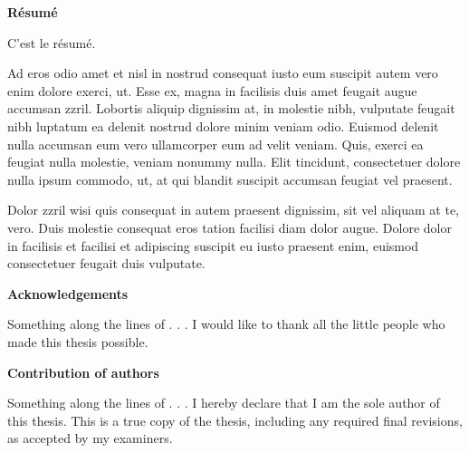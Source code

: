 
\begin{center}\textbf{R\'{e}sum\'{e}}\end{center}

C'est le r\'{e}sum\'{e}.

Ad eros odio amet et nisl in nostrud consequat iusto eum suscipit autem vero enim dolore exerci, ut. Esse ex, magna in facilisis duis amet feugait augue accumsan zzril. Lobortis aliquip dignissim at, in molestie nibh, vulputate feugait nibh luptatum ea delenit nostrud dolore minim veniam odio. Euismod delenit nulla accumsan eum vero ullamcorper eum ad velit veniam. Quis, exerci ea feugiat nulla molestie, veniam nonummy nulla. Elit tincidunt, consectetuer dolore nulla ipsum commodo, ut, at qui blandit suscipit accumsan feugiat vel praesent.

Dolor zzril wisi quis consequat in autem praesent dignissim, sit vel aliquam at te, vero. Duis molestie consequat eros tation facilisi diam dolor augue. Dolore dolor in facilisis et facilisi et adipiscing suscipit eu iusto praesent enim, euismod consectetuer feugait duis vulputate.

\cleardoublepage


\begin{center}\textbf{Acknowledgements}\end{center}

Something along the lines of . . . I would like to thank all the little people who made this thesis possible.
\cleardoublepage

 \begin{center}\textbf{Contribution of authors}\end{center}
  
 \noindent
Something along the lines of . . . I hereby declare that I am the sole author of this thesis. This is a true copy of the thesis, including any required final revisions, as accepted by my examiners.

\cleardoublepage




